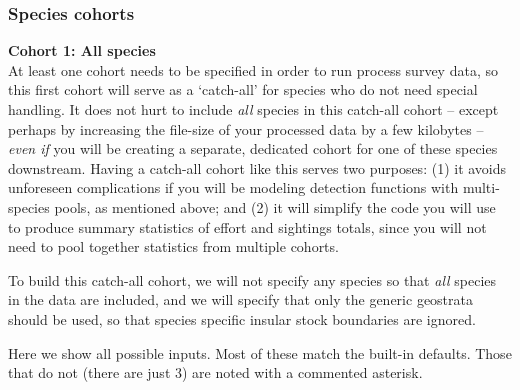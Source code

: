 \documentclass[
]{book}
\begin{document}
\hypertarget{species-cohorts}{%
\subsubsection*{Species cohorts}\label{species-cohorts}}

\textbf{Cohort 1: All species}\\
At least one cohort needs to be specified in order to run process survey data, so this first cohort will serve as a `catch-all' for species who do not need special handling. It does not hurt to include \emph{all} species in this catch-all cohort -- except perhaps by increasing the file-size of your processed data by a few kilobytes -- \emph{even if} you will be creating a separate, dedicated cohort for one of these species downstream. Having a catch-all cohort like this serves two purposes: (1) it avoids unforeseen complications if you will be modeling detection functions with multi-species pools, as mentioned above; and (2) it will simplify the code you will use to produce summary statistics of effort and sightings totals, since you will not need to pool together statistics from multiple cohorts.

To build this catch-all cohort, we will not specify any species so that \emph{all} species in the data are included, and we will specify that only the generic geostrata should be used, so that species specific insular stock boundaries are ignored.

Here we show all possible inputs. Most of these match the built-in defaults. Those that do not (there are just 3) are noted with a commented asterisk.
\end{document}
